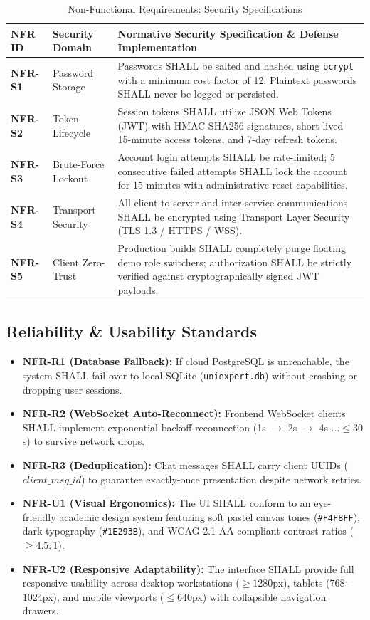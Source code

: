 \documentclass[10.5pt,a4paper]{article}
\begin{document}
\begin{table}[h]
\centering
\small
\begin{tabularx}{\linewidth}{|l|l|X|}
\hline
\rowcolor{headergray} \textbf{NFR ID} & \textbf{Security Domain} & \textbf{Normative Security Specification \& Defense Implementation} \\ \hline
\textbf{NFR-S1} & Password Storage & Passwords SHALL be salted and hashed using \texttt{bcrypt} with a minimum cost factor of 12. Plaintext passwords SHALL never be logged or persisted. \\ \hline
\textbf{NFR-S2} & Token Lifecycle & Session tokens SHALL utilize JSON Web Tokens (JWT) with HMAC-SHA256 signatures, short-lived 15-minute access tokens, and 7-day refresh tokens. \\ \hline
\textbf{NFR-S3} & Brute-Force Lockout & Account login attempts SHALL be rate-limited; 5 consecutive failed attempts SHALL lock the account for 15 minutes with administrative reset capabilities. \\ \hline
\textbf{NFR-S4} & Transport Security & All client-to-server and inter-service communications SHALL be encrypted using Transport Layer Security (TLS 1.3 / HTTPS / WSS). \\ \hline
\textbf{NFR-S5} & Client Zero-Trust & Production builds SHALL completely purge floating demo role switchers; authorization SHALL be strictly verified against cryptographically signed JWT payloads. \\ \hline
\end{tabularx}
\caption{Non-Functional Requirements: Security Specifications}
\end{table}

\subsection{Reliability \& Usability Standards}
\begin{itemize}[leftmargin=*]
    \item \textbf{NFR-R1 (Database Fallback):} If cloud PostgreSQL is unreachable, the system SHALL fail over to local SQLite (\texttt{uniexpert.db}) without crashing or dropping user sessions.
    \item \textbf{NFR-R2 (WebSocket Auto-Reconnect):} Frontend WebSocket clients SHALL implement exponential backoff reconnection (1s $\rightarrow$ 2s $\rightarrow$ 4s $\dots \le 30$s) to survive network drops.
    \item \textbf{NFR-R3 (Deduplication):} Chat messages SHALL carry client UUIDs ($client\_msg\_id$) to guarantee exactly-once presentation despite network retries.
    \item \textbf{NFR-U1 (Visual Ergonomics):} The UI SHALL conform to an eye-friendly academic design system featuring soft pastel canvas tones (\texttt{\#F4F8FF}), dark typography (\texttt{\#1E293B}), and WCAG 2.1 AA compliant contrast ratios ($\ge 4.5:1$).
    \item \textbf{NFR-U2 (Responsive Adaptability):} The interface SHALL provide full responsive usability across desktop workstations ($\ge 1280$px), tablets ($768$--$1024$px), and mobile viewports ($\le 640$px) with collapsible navigation drawers.
\end{itemize}
\end{document}
